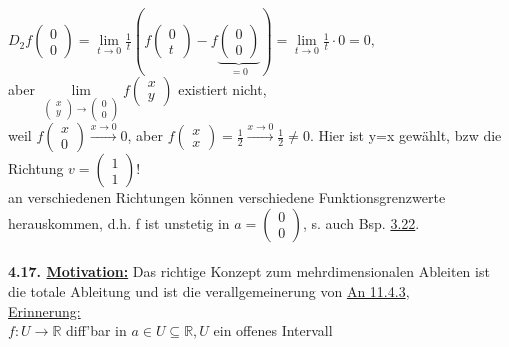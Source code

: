\documentclass[]{scrartcl}
\begin{document}
$D_2f\begin{pmatrix}
	0\\0
\end{pmatrix}= \lim\limits_{t\rightarrow0}\frac{1}{t}(f\begin{pmatrix}
	0\\t
\end{pmatrix}-f\underbrace{\begin{pmatrix}
	0\\0
\end{pmatrix}}_{=0})=\lim\limits_{t\rightarrow 0}\frac{1}{t}\cdot0=0,$\\
aber $\lim\limits_{\begin{pmatrix}
	x\\y
\end{pmatrix}\rightarrow\begin{pmatrix}
	0\\0
\end{pmatrix}}f\begin{pmatrix}
	x\\y
\end{pmatrix}$ existiert nicht,\\
weil $f\begin{pmatrix}
	x\\0
\end{pmatrix}\xrightarrow{x\rightarrow0}0$, aber $ f\begin{pmatrix}
	x\\x
\end{pmatrix}=\frac{1}{2}\xrightarrow{x\rightarrow0}\frac{1}{2}\neq0.$ Hier ist 
y=x gewählt, bzw die Richtung $v=\begin{pmatrix}
	1\\1
\end{pmatrix}!$\\
an verschiedenen Richtungen können verschiedene Funktionsgrenzwerte 
herauskommen, d.h. f ist unstetig in $a=\begin{pmatrix}
	0\\0
\end{pmatrix}$,  s. auch Bsp. \ul{3.22}.\\
\\
\textbf{4.17. \underline{Motivation:}} Das richtige Konzept zum 
mehrdimensionalen Ableiten ist die totale Ableitung und ist die 
verallgemeinerung von \ul{An 11.4.3},\\
\underline{Erinnerung:}\\
$f:U\rightarrow\mathbb{R}$ diff'bar in $a\in U\subseteq\mathbb{R}, U$ ein 
offenes Intervall\\
\end{document}
